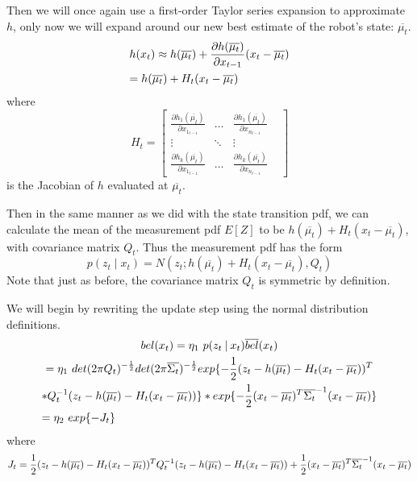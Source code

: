 Then we will once again use a first-order Taylor series expansion to approximate \(h\), only now we will expand around our new best estimate of the robot's state: \(\overline{\mu_t}\).
\begin{multline*}
h(x_t) \approx h(\overline{\mu_t}) + \frac{\partial h(\overline{\mu_t})}{\partial x_{t-1}} (x_t - \overline{\mu_t}) \\
= h(\overline{\mu_t}) + H_t (x_t - \overline{\mu_t}) \hfill
\end{multline*}
where \[
H_t = \begin{bmatrix} 
\frac{\partial h_1(\overline{\mu_t})}{\partial x_{1_{t-1}}} & \dots & \frac{\partial h_1(\overline{\mu_t})}{\partial x_{n_{t-1}}}\\
\vdots & \ddots & \vdots & \\
\frac{\partial h_k(\overline{\mu_t})}{\partial x_{1_{t-1}}} & \dots & \frac{\partial h_k(\overline{\mu_t})}{\partial x_{n_{t-1}}} 
\end{bmatrix} \] is the Jacobian of \(h\) evaluated at \(\overline{\mu_t}\).

Then in the same manner as we did with the state transition pdf, we can calculate the mean of the measurement pdf \(E[Z]\) to be \(h(\overline{\mu_t}) + H_t (x_t - \overline{\mu_t})\), with covariance matrix \(Q_t\). Thus the measurement pdf has the form \[p(z_t \mathbin{\vert} x_t)  = N(z_t;h(\overline{\mu_t}) + H_t (x_t - \overline{\mu_t}),Q_t)\] Note that just as before, the covariance matrix \(Q_t\) is symmetric by definition.

We will begin by rewriting the update step using the normal distribution definitions.
\begin{multline*}
bel(x_t) = \eta_1\ p(z_t \mathbin{\vert} x_t) \overline{bel}(x_t) \\
= \eta_1\ det(2 \pi Q_t)^{-\frac{1}{2}} det(2 \pi \overline{\Sigma_t})^{-\frac{1}{2}} exp\{-\frac{1}{2} (z_t - h(\overline{\mu_t}) - H_t (x_t - \overline{\mu_t}))^T \\ * Q_t^{-1} (z_t - h(\overline{\mu_t}) - H_t (x_t - \overline{\mu_t}))\} * exp \{-\frac{1}{2} (x_t - \overline{\mu_t})^T \overline{\Sigma_t}^{-1} (x_t - \overline{\mu_t}) \} \\
= \eta_2\ exp\{-J_t\} \hfill
\end{multline*} where \[
J_t = \frac{1}{2} (z_t - h(\overline{\mu_t}) - H_t (x_t - \overline{\mu_t}))^T Q_t^{-1} (z_t - h(\overline{\mu_t}) - H_t (x_t - \overline{\mu_t})) \\
+ \frac{1}{2} (x_t - \overline{\mu_t})^T \overline{\Sigma_t}^{-1} (x_t - \overline{\mu_t})
\]


